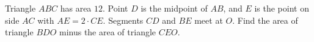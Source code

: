 Triangle $ABC$ has area $12$. Point $D$ is the midpoint of $AB$, and $E$ is the point on side $AC$ with $AE=2\cdot CE$. Segments $CD$ and $BE$ meet at $O$. Find the area of triangle $BDO$ minus the area of triangle $CEO$.
